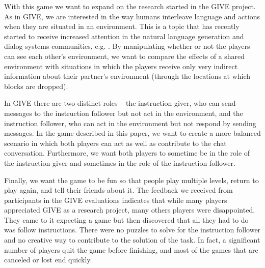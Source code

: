 With this game we want to expand on the research started in the GIVE
project. As in GIVE, we are interested in the way humans interleave
language and actions when they are situated in an environment. This is
a topic that has recently started to receive increased attention in
the natural language generation and dialog systems communities, e.g.
\cite{stoia-etal-2006,garoufi-koller-2010,dethlefs-etal-2011}.  By
manipulating whether or not the players can see each other's
environment, we want to compare the effects of a shared environment
with situations in which the players receive only very indirect
information about their partner's environment (through the locations
at which blocks are dropped).

In GIVE there are two distinct roles -- the instruction giver, who can
send messages to the instruction follower but not act in the
environment, and the instruction follower, who can act in the
environment but not respond by sending messages. In the game described
in this paper, we want to create a more balanced scenario in which
both players can act as well as contribute to the chat
conversation. Furthermore, we want both players to sometime be in the
role of the instruction giver and sometimes in the role of the
instruction follower.


Finally, we want the game to be fun so that people play multiple
levels, return to play again, and tell their friends about it.  The
feedback we received from participants in the GIVE evaluations
indicates that while many players appreciated GIVE as a research
project, many others players were disappointed. They came to it
expecting a game but then discovered that all they had to do was
follow instructions. There were no puzzles to solve for the
instruction follower and no creative way to contribute to the solution
of the task. In fact, a significant number of players quit the game
before finishing, and most of the games that are canceled or lost end
quickly.







